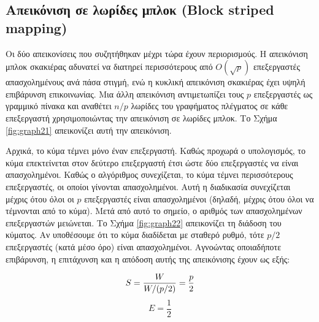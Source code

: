 \documentclass[12pt,a4paper]{article}
\begin{document}
\subsection*{Απεικόνιση σε λωρίδες μπλοκ (\foreignlanguage{english}{Block striped mapping})} 
Οι δύο απεικονίσεις που συζητήθηκαν μέχρι τώρα έχουν περιορισμούς. 
Η απεικόνιση μπλοκ σκακιέρας
αδυνατεί να διατηρεί περισσότερους από $O(\sqrt{p})$ επεξεργαστές
απασχολημένους ανά πάσα στιγμή, ενώ η κυκλική απεικόνιση σκακιέρας
έχει υψηλή επιβάρυνση επικοινωνίας. Μια άλλη απεικόνιση αντιμετωπίζει
τους $p$ επεξεργαστές ως γραμμικό πίνακα και αναθέτει $n/p$ λωρίδες
του γραφήματος πλέγματος σε κάθε επεξεργαστή χρησιμοποιώντας την
απεικόνιση σε λωρίδες μπλοκ. Το Σχήμα \ref{fig:graph21} απεικονίζει αυτή την
απεικόνιση.

Αρχικά, το κύμα τέμνει μόνο έναν επεξεργαστή. Καθώς προχωρά ο
υπολογισμός, το κύμα επεκτείνεται στον δεύτερο επεξεργαστή έτσι ώστε
δύο επεξεργαστές να είναι απασχολημένοι. Καθώς ο αλγόριθμος συνεχίζεται,
το κύμα τέμνει περισσότερους επεξεργαστές, οι οποίοι γίνονται
απασχολημένοι. Αυτή η διαδικασία συνεχίζεται μέχρις ότου όλοι οι $p$
επεξεργαστές είναι απασχολημένοι (δηλαδή, μέχρις ότου όλοι να τέμνονται
από το κύμα). Μετά από αυτό το σημείο, ο αριθμός των
απασχολημένων επεξεργαστών μειώνεται. Το Σχήμα \ref{fig:graph22} απεικονίζει τη
διάδοση του κύματος. Αν υποθέσουμε ότι το κύμα διαδίδεται με σταθερό
ρυθμό, τότε $p/2$ επεξεργαστές (κατά μέσο όρο) είναι απασχολημένοι.
Αγνοώντας οποιαδήποτε επιβάρυνση, η επιτάχυνση και η απόδοση αυτής
της απεικόνισης έχουν ως εξής:

\[
S = \frac{W}{W/(p/2)} = \frac{p}{2} \\[6pt]
\]
\[
E = \frac{1}{2}
\]
\end{document}
